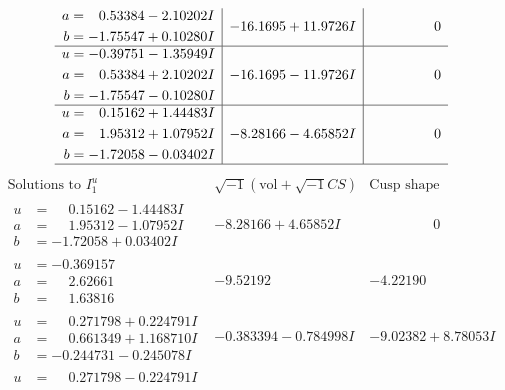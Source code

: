 \documentclass[1p]{elsarticle_modified}
\theoremstyle{definition}
\newcommand{\I}{\sqrt{-1}}
\begin{document}
$$\begin{array}{c|c|c}
\begin{aligned}
a &= \phantom{-}0.53384 - 2.10202 I \\
b &= -1.75547 + 0.10280 I\end{aligned}
 & -16.1695 + 11.9726 I & \phantom{-0.000000 } 0 \\ \hline\begin{aligned}
u &= -0.39751 - 1.35949 I \\
a &= \phantom{-}0.53384 + 2.10202 I \\
b &= -1.75547 - 0.10280 I\end{aligned}
 & -16.1695 - 11.9726 I & \phantom{-0.000000 } 0 \\ \hline\begin{aligned}
u &= \phantom{-}0.15162 + 1.44483 I \\
a &= \phantom{-}1.95312 + 1.07952 I \\
b &= -1.72058 - 0.03402 I\end{aligned}
 & -8.28166 - 4.65852 I & \phantom{-0.000000 } 0\\
 \hline 
 \end{array}$$\newpage$$\begin{array}{c|c|c}  
\text{Solutions to }I^u_{1}& \I (\text{vol} + \sqrt{-1}CS) & \text{Cusp shape}\\
 \hline 
\begin{aligned}
u &= \phantom{-}0.15162 - 1.44483 I \\
a &= \phantom{-}1.95312 - 1.07952 I \\
b &= -1.72058 + 0.03402 I\end{aligned}
 & -8.28166 + 4.65852 I & \phantom{-0.000000 } 0 \\ \hline\begin{aligned}
u &= -0.369157\phantom{ +0.000000I} \\
a &= \phantom{-}2.62661\phantom{ +0.000000I} \\
b &= \phantom{-}1.63816\phantom{ +0.000000I}\end{aligned}
 & -9.52192\phantom{ +0.000000I} & -4.22190\phantom{ +0.000000I} \\ \hline\begin{aligned}
u &= \phantom{-}0.271798 + 0.224791 I \\
a &= \phantom{-}0.661349 + 1.168710 I \\
b &= -0.244731 - 0.245078 I\end{aligned}
 & -0.383394 - 0.784998 I & -9.02382 + 8.78053 I \\ \hline\begin{aligned}
u &= \phantom{-}0.271798 - 0.224791 I \\

\end{aligned}
\end{array}$$
\end{document}
